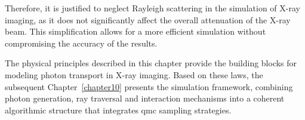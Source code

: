 Therefore, it is justified to neglect Rayleigh scattering in the simulation of
X-ray imaging, as it does not significantly affect the overall attenuation of
the X-ray beam. This simplification allows for a more efficient simulation
without compromising the accuracy of the results.

\bigskip
The physical principles described in this chapter provide the building blocks
for modeling photon transport in X-ray imaging. Based on these laws, the
subsequent Chapter~\ref{chapter10} presents the simulation
framework, combining photon generation, ray traversal and interaction
mechanisms into a coherent algorithmic structure that integrates \ac{qmc}
sampling strategies.
